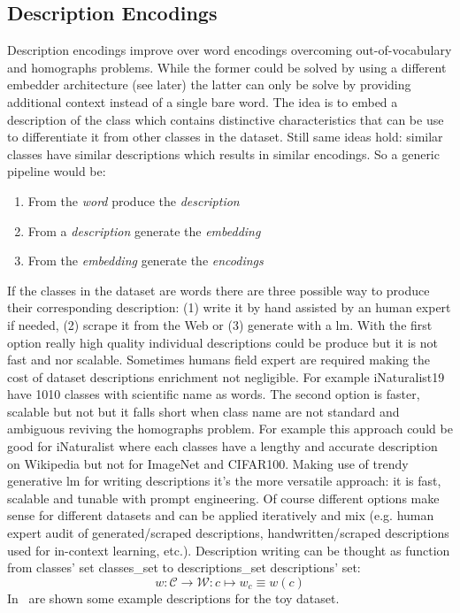 \subsection{Description Encodings}
\label{subsec:description-encodings}

Description encodings improve over word encodings overcoming out-of-vocabulary
and homographs problems. While the former could be solved by using a different
embedder architecture (see later) the latter can only be solve by providing
additional context instead of a single bare word. The idea is to embed a
description of the class which contains distinctive characteristics that can be
use to differentiate it from other classes in the dataset. Still same ideas
hold: similar classes have similar descriptions which results in similar
encodings. So a generic pipeline would be:
\begin{enumerate}
  \item From the \emph{word} produce the \emph{description}
  \item From a \emph{description} generate the \emph{embedding}
  \item From the \emph{embedding} generate the \emph{encodings}
\end{enumerate}

If the classes in the dataset are words there are three possible way to produce
their corresponding description: (1) write it by hand assisted by an human
expert if needed, (2) scrape it from the Web or (3) generate with a
\acrshort{lm}. With the first option really high quality individual descriptions
could be produce but it is not fast and nor scalable. Sometimes humans field
expert are required making the cost of dataset descriptions enrichment not
negligible. For example iNaturalist19 have 1010 classes with scientific name as
words. The second option is faster, scalable but not but it falls short when
class name are not standard and ambiguous reviving the homographs problem. For
example this approach could be good for iNaturalist where each classes have a
lengthy and accurate description on Wikipedia but not for ImageNet and CIFAR100.
Making use of trendy generative \acrshort{lm} for writing descriptions it's the
more versatile approach: it is fast, scalable and tunable with prompt
engineering. Of course different options make sense for different datasets and
can be applied iteratively and mix (e.g. human expert audit of generated/scraped
descriptions, handwritten/scraped descriptions used for in-context learning,
etc.). Description writing can be thought as function from classes' set
\gls{classes_set} to \gls{descriptions_set} descriptions' set:
\begin{equation}
  w : \mathcal{C} \to \mathcal{W}:
  c \mapsto w_c \equiv w(c)
  \label{eq:desc-writing}
\end{equation}
In~ are shown some example descriptions for the toy
dataset.

